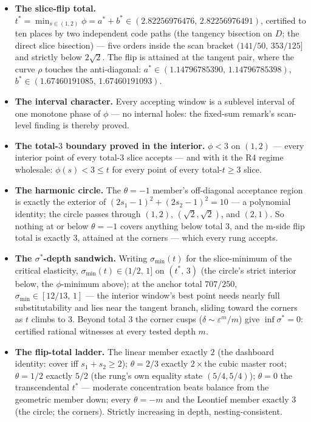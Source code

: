 \documentclass[3p,11pt]{elsarticle}
\providecommand{\tightlist}{\setlength{\itemsep}{0pt}\setlength{\parskip}{0pt}}
\begin{document}
\begin{itemize}
\tightlist
\item
  \textbf{The slice-flip total.} \(t^{*} = \min_{s\in(1,2)}\phi =
  a^{*} + b^{*} \in (2.82256976476,\, 2.82256976491)\), certified to
  ten places by two independent code paths (the tangency bisection
  on \(D\); the direct slice bisection) --- five orders inside the
  scan bracket \((141/50,\, 353/125]\) and strictly below
  \(2\sqrt{2}\). The flip is attained at the tangent pair, where the
  curve \(\rho\) touches the anti-diagonal:
  \(a^{*} \in (1.14796785390,\, 1.14796785398)\),
  \(b^{*} \in (1.67460191085,\, 1.67460191093)\).
\item
  \textbf{The interval character.} Every accepting window is a
  sublevel interval of one monotone phase of \(\phi\) --- no internal
  holes: the fixed-sum remark's scan-level finding is thereby
  proved.
\item
  \textbf{The total-\(3\) boundary proved in the interior.}
  \(\phi < 3\) on \((1,2)\) --- every interior point of every
  total-\(3\) slice accepts --- and with it the R4 regime wholesale:
  \(\phi(s) < 3 \le t\) for every point of every total-\(t \ge 3\)
  slice.
\item
  \textbf{The harmonic circle.} The \(\theta = -1\) member's
  off-diagonal acceptance region is exactly the exterior of
  \((2s_1-1)^2 + (2s_2-1)^2 = 10\) --- a polynomial identity; the
  circle passes through \((1,2)\), \((\sqrt{2},\sqrt{2})\), and
  \((2,1)\). So nothing at or below \(\theta = -1\) covers anything
  below total \(3\), and the m-side flip total is exactly \(3\),
  attained at the corners --- which every rung accepts.
\item
  \textbf{The \(\sigma^{*}\)-depth sandwich.} Writing
  \(\sigma_{\min}(t)\) for the slice-minimum of the critical
  elasticity, \(\sigma_{\min}(t) \in (1/2,\, 1]\) on
  \((t^{*},\, 3)\) (the circle's strict interior below, the
  \(\phi\)-minimum above); at the anchor total \(707/250\),
  \(\sigma_{\min} \in [12/13,\, 1]\) --- the interior window's best
  point needs nearly full substitutability and lies near the tangent
  branch, sliding toward the corners as \(t\) climbs to \(3\).
  Beyond total \(3\) the corner cusps
  (\(\delta \sim \varepsilon^{m}/m\)) give \(\inf \sigma^{*} = 0\):
  certified rational witnesses at every tested depth \(m\).
\item
  \textbf{The flip-total ladder.} The linear member exactly \(2\)
  (the dashboard identity: cover iff \(s_1 + s_2 \ge 2\));
  \(\theta = 2/3\) exactly \(2\times\)the cubic master root;
  \(\theta = 1/2\) exactly \(5/2\) (the rung's own equality state
  \((5/4, 5/4)\)); \(\theta = 0\) the transcendental \(t^{*}\) ---
  moderate concentration beats balance from the geometric member
  down; every \(\theta = -m\) and the Leontief member exactly \(3\)
  (the circle; the corners). Strictly increasing in depth,
  nesting-consistent.
\end{itemize}
\end{document}
